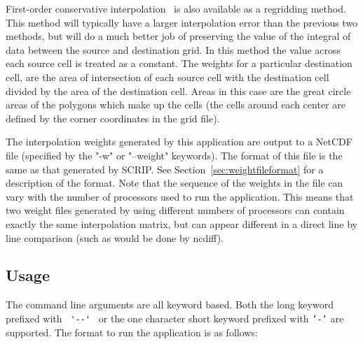 First-order conservative interpolation~\cite{ConservativeOrder1} is also available as a regridding method. This method will typically have  
a larger interpolation error than the previous two methods, but will do a much better job of preserving the value of the 
integral of data between the source and destination grid. In this method the value across each source cell
is treated as a constant. The weights for a particular destination cell, are the area of intersection of each 
source cell with the destination cell divided by the area of the destination cell.
Areas in this case are the great circle 
areas of the polygons which make up the cells (the cells around each center are defined by the corner coordinates 
in the grid file). 

The interpolation weights generated by this application are output to a NetCDF file (specified by the "-w" or "--weight"
keywords). The format of this file is the same as that generated by SCRIP. See Section~\ref{sec:weightfileformat} for a description of the format.
Note that the sequence of the weights in the file can 
vary with the number of processors used to run the application. This means that two weight files generated by using different
numbers of processors can contain exactly the same interpolation matrix, but can appear different in a direct line by line
comparison (such as would be done by ncdiff).

\subsection{Usage}

The command line arguments are all keyword based.  Both the long keyword prefixed with \verb+ '--' + or the 
one character short keyword prefixed with {\tt '-'} are supported.  The format to run the application is 
as follows:

